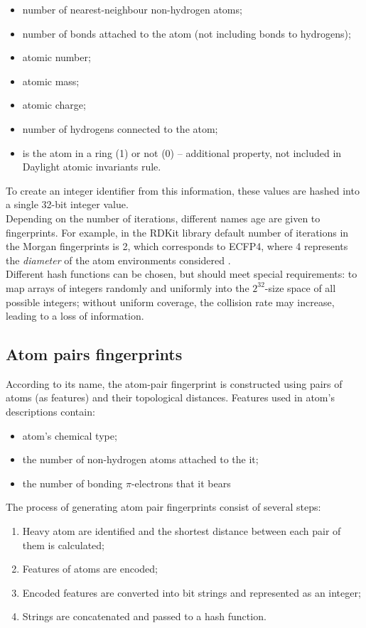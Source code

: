  \begin{itemize}
     \item number of nearest-neighbour non-hydrogen atoms;
     \item number of bonds attached to the atom (not including bonds to hydrogens);
     \item atomic number;
     \item atomic mass;
     \item atomic charge;
     \item number of hydrogens connected to the atom;
     \item is the atom in a ring (1) or not (0) -- additional property, not included in Daylight atomic invariants rule.
 \end{itemize}
 To create an integer identifier from this information, these values are hashed into a single 32-bit integer value.\\
 
 Depending on the number of iterations, different names age are given to fingerprints.
 For example, in the RDKit library default number of iterations in the Morgan fingerprints is 2, which corresponds to ECFP4, where 4 represents the \textit{diameter} of the atom environments considered \cite{Landrum2010RDKit:Cheminformatics}.\\
 
 Different hash functions can be chosen, but should meet special requirements: to map arrays of integers randomly and uniformly into the $2^{32}$-size space of all possible integers; without uniform coverage, the collision rate may increase, leading to a loss of information.

\subsection{Atom pairs fingerprints}
 According to its name, the atom-pair fingerprint is constructed using pairs of atoms (as features) and their topological distances.
 Features used in atom's descriptions contain:
\begin{itemize}
    \item atom's chemical type;
    \item the number of non-hydrogen atoms attached to the it;
    \item the number of bonding $\pi$-electrons that it bears
\end{itemize}
The process of generating atom pair fingerprints consist of several steps:
\begin{enumerate}
    \item Heavy atom are identified and the shortest distance between each pair of them is calculated;
    \item Features of atoms are encoded;
    \item Encoded features are  converted into bit strings and represented as an integer;
    \item Strings are concatenated and passed to a hash function.
\end{enumerate}

